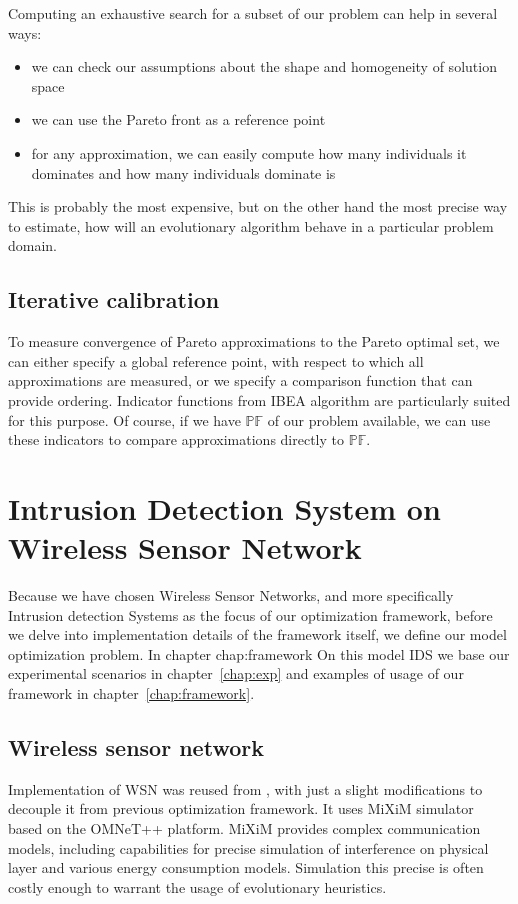 \documentclass[12pt,oneside]{fithesis2}
\begin{document}
Computing an exhaustive search for a subset of our problem can help in several ways:
\begin{itemize}
  \item we can check our assumptions about the shape and homogeneity of solution space
  \item we can use the Pareto front as a reference point
  \item for any approximation, we can easily compute how many individuals it dominates and how many individuals dominate is
\end{itemize}

This is probably the most expensive, but on the other hand the most precise way to estimate, how will an evolutionary algorithm behave in a particular problem domain.

\section{Iterative calibration}

To measure convergence of Pareto approximations to the Pareto optimal set, we can either specify a global reference point, with respect to which all approximations are measured, or we specify a comparison function that can provide ordering. Indicator functions from IBEA algorithm are particularly suited for this purpose. Of course, if we have $\mathbb{PF}$ of our problem available, we can use these indicators to compare approximations directly to $\mathbb{PF}$.

\chapter{Intrusion Detection System on Wireless Sensor Network}
\label{chap:WSN}
Because we have chosen Wireless Sensor Networks, and more specifically Intrusion detection Systems as the focus of our optimization framework, before we delve into implementation details of the framework itself, we define our model optimization problem.
In chapter chap:framework On this model IDS we base our experimental scenarios in chapter~\ref{chap:exp} and examples of usage of our framework in chapter~\ref{chap:framework}.

\section{Wireless sensor network}
Implementation of WSN was reused from \cite{Stetsko12}, with just a slight modifications to decouple it from previous optimization framework. It uses MiXiM simulator based on the OMNeT++ platform. MiXiM provides complex communication models, including capabilities for precise simulation of interference on physical layer and various energy consumption models. Simulation this precise is often costly enough to warrant the usage of evolutionary heuristics.
\end{document}
